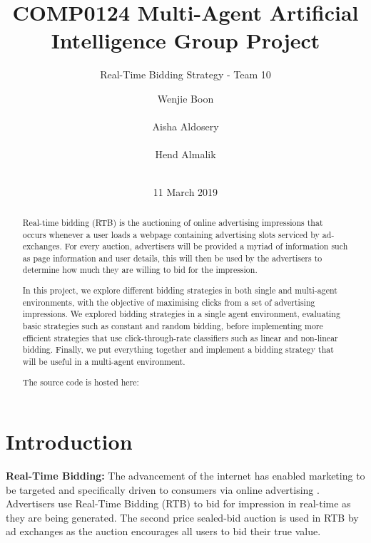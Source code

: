 \documentclass{sig-alternate-05-2015}
\begin{document}

\title{COMP0124 Multi-Agent Artificial Intelligence Group Project}
\subtitle{Real-Time Bidding Strategy - Team 10}


\author{
\alignauthor
Wenjie Boon\\
       \\
\alignauthor
Aisha Aldosery\\
       \\
\alignauthor
Hend Almalik\\
       \\
}

\date{11 March 2019}

\maketitle
\begin{abstract}
Real-time bidding (RTB) is the auctioning of online advertising impressions that occurs whenever a user loads a webpage containing advertising slots serviced by ad-exchanges. For every auction, advertisers will be provided a myriad of information such as page information and user details, this will then be used by the advertisers to determine how much they are willing to bid for the impression.

In this project, we explore different bidding strategies in both single and multi-agent environments, with the objective of maximising clicks from a set of advertising impressions. We explored bidding strategies in a single agent environment, evaluating basic strategies such as constant and random bidding, before implementing more efficient strategies that use click-through-rate classifiers such as linear and non-linear bidding. Finally, we put everything together and implement a bidding strategy that will be useful in a multi-agent environment.

The source code is hosted here: \href{https://github.com/boonwj/real-time-bidding}{\color{blue}{boonwj/real-time-bidding}}

\end{abstract}

\section{Introduction}
\textbf{Real-Time Bidding:}
The advancement of the internet has enabled marketing to be targeted and specifically driven to consumers via online advertising \cite{david_online_2009, gold_targeting_2011}. Advertisers use Real-Time Bidding (RTB) \cite{wang_display_2017} to bid for impression in real-time as they are being generated. The second price sealed-bid auction is used in RTB by ad exchanges \cite{yuan_rev_2014} as the auction encourages all users to bid their true value.
\end{document}
